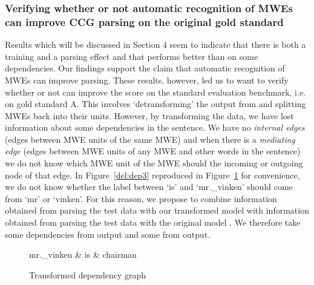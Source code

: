 \documentclass[output=paper]{langsci/langscibook}
\begin{document}
    \subsubsection{Verifying whether or not automatic recognition of MWEs can improve CCG parsing on the original gold standard}
    \label{del:evalA}
    \indent Results which will be discussed in Section 4 seem to indicate that there is both a training and a parsing effect and that {\modelB} performs better than {\modelA} on some dependencies. Our findings support the claim that automatic recognition of MWEs can improve  parsing. These results, however, led us to want to verify whether or not {\modelB} can improve the score on the standard evaluation benchmark, i.e. on gold standard A. This involves `detransforming' the output from {\modelB} and splitting MWEs back into their units. However, by transforming the data, we have lost information about some dependencies in the sentence. We have no \textit{internal edges} (edges between MWE units of the same MWE) and when there is a \textit{mediating edge} (edges between MWE units of any MWE and other words in the sentence) we do not know which MWE unit of the MWE should the incoming or outgoing node of that edge. In Figure~\ref{del:dep3} reproduced in Figure~\ref{del:dep5} for convenience, we do not know whether the label between `is' and `mr.\_vinken' should come from `mr' or `vinken'. For this reason, we propose to combine information obtained from parsing the test data with our transformed model {\modelB} with information obtained from parsing the test data with the original model {\modelA}. We therefore take some dependencies from output and some from output.

    \begin{figure}[h]
        \center
        \begin{dependency}
            \begin{deptext}[column sep=1em]
                mr.\_vinken \& is \& chairman \\
            \end{deptext}
        \end{dependency}
        \caption{Transformed dependency graph\label{del:dep5}}
    \end{figure}
\end{document}
